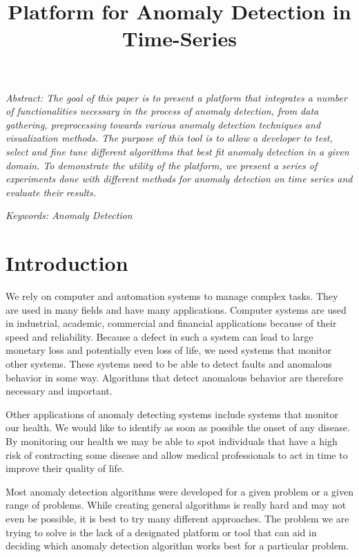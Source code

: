 \documentclass[a4paper, 10pt]{article}
\title{\huge Platform for Anomaly Detection in Time-Series}
\begin{document}
\maketitle

\noindent \hrulefill

\small
\textit{
Abstract: The goal of this paper is to present a platform that integrates a number of functionalities necessary in the process of anomaly detection, from data gathering, preprocessing towards various anomaly detection techniques and visualization methods. The purpose of this tool is to allow a developer to test, select and fine tune different algorithms that best fit anomaly detection in a given domain. To demonstrate the utility of the platform, we present a series of experiments done with different methods for anomaly detection on time series and evaluate their results.
}

\noindent \hrulefill

\textit{
Keywords: Anomaly Detection
}

\normalsize

\section{Introduction}

We rely on computer and automation systems to manage complex tasks. They are used in many fields and have many applications. Computer systems are used in industrial, academic, commercial and financial applications because of their speed and reliability. Because a defect in such a system can lead to large monetary loss and potentially even loss of life, we need systems that monitor other systems. These systems need to be able to detect faults and anomalous behavior in some way. Algorithms that detect anomalous behavior are therefore necessary and important.

Other applications of anomaly detecting systems include systems that monitor our health. We would like to identify as soon as possible the onset of any disease. By monitoring our health we may be able to spot individuals that have a high risk of contracting some disease and allow medical professionals to act in time to improve their quality of life.

Most anomaly detection algorithms were developed for a given problem or a given range of problems. While creating general algorithms is really hard and may not even be possible, it is best to try many different approaches. The problem we are trying to solve is the lack of a designated platform or tool that can aid in deciding which anomaly detection algorithm works best for a particular problem.
\end{document}
